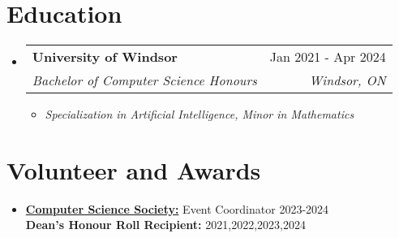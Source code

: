 \documentclass[letterpaper,11pt]{article}
\makeatletter
\newcommand{\resumeItem}[1]{
  \item\small{
    {#1 \vspace{-2pt}}
  }
}
\newcommand{\resumeSubheading}[4]{
  \vspace{-2pt}\item
    \begin{tabular*}{0.97\textwidth}[t]{l@{\extracolsep{\fill}}r}
      \textbf{#1} & #2 \\
      \textit{\small#3} & \textit{\small #4} \\
    \end{tabular*}\vspace{-7pt}
}
\newcommand{\resumeSubHeadingListStart}{\begin{itemize}[leftmargin=0.15in, label={}]}
\newcommand{\resumeSubHeadingListEnd}{\end{itemize}}
\newcommand{\resumeItemListStart}{\begin{itemize}}
\newcommand{\resumeItemListEnd}{\end{itemize}\vspace{-5pt}}
\makeatother
\begin{document}
  \section{Education}
  \resumeSubHeadingListStart
    \resumeSubheading
      {University of Windsor}{Jan 2021 - Apr 2024}
      {Bachelor of Computer Science Honours}{Windsor, ON}
    \resumeItemListStart
      \resumeItem{\textit{Specialization in Artificial Intelligence, Minor in Mathematics}}
    \resumeItemListEnd
    
  \resumeSubHeadingListEnd  

\section{Volunteer and Awards}
 \begin{itemize}[leftmargin=0.15in, label={}]
    \small\item{
     {\href{https://css.uwindsor.ca}{\textbf{Computer Science Society:}} {Event Coordinator 2023-2024} \\
     \textbf{Dean's Honour Roll Recipient:} {2021,2022,2023,2024} \\
    }}
\end{itemize}

\end{document}
